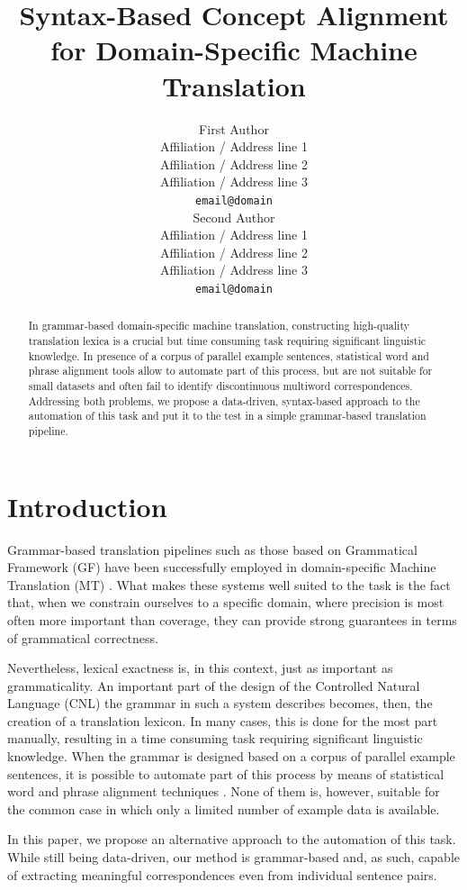 \documentclass[11pt]{article}
\title{Syntax-Based Concept Alignment for Domain-Specific Machine Translation}
\author{First Author \\
  Affiliation / Address line 1 \\
  Affiliation / Address line 2 \\
  Affiliation / Address line 3 \\
  \texttt{email@domain} \\\And
  Second Author \\
  Affiliation / Address line 1 \\
  Affiliation / Address line 2 \\
  Affiliation / Address line 3 \\
  \texttt{email@domain} \\}
\begin{document}
\maketitle
\begin{abstract}
In grammar-based domain-specific machine translation, constructing high-quality translation lexica is a crucial but time consuming task requiring significant linguistic knowledge. 
In presence of a corpus of parallel example sentences, statistical word and phrase alignment tools allow to automate part of this process, but are not suitable for small datasets and often fail to identify discontinuous multiword correspondences. 
Addressing both problems, we propose a data-driven, syntax-based approach to the automation of this task and put it to the test in a simple grammar-based translation pipeline.
\end{abstract}

\section{Introduction}
Grammar-based translation pipelines such as those based on Grammatical Framework (GF) have been successfully employed in domain-specific Machine Translation (MT) \cite{ranta-etal-2020-abstract}.  
What makes these systems well suited to the task is the fact that, when we constrain ourselves to a specific domain, where precision is most often more important than coverage, they can provide strong guarantees in terms of grammatical correctness. 

Nevertheless, lexical exactness is, in this context, just as important as grammaticality. 
An important part of the design of the Controlled Natural Language (CNL) the grammar in such a system describes becomes, then, the creation of a translation lexicon. 
In many cases, this is done for the most part manually, resulting in a time consuming task requiring significant linguistic knowledge. 
When the grammar is designed based on a corpus of parallel example sentences, it is possible to automate part of this process by means of statistical word and phrase alignment techniques \cite{brown-etal-1993-mathematics, och-ney-2000-improved, dyer-etal-2013-simple}. 
None of them is, however, suitable for the common case in which only a limited number of example data is available.

In this paper, we propose an alternative approach to the automation of this task. 
While still being data-driven, our method is grammar-based and, as such, capable of extracting meaningful correspondences even from individual sentence pairs. 
\end{document}
